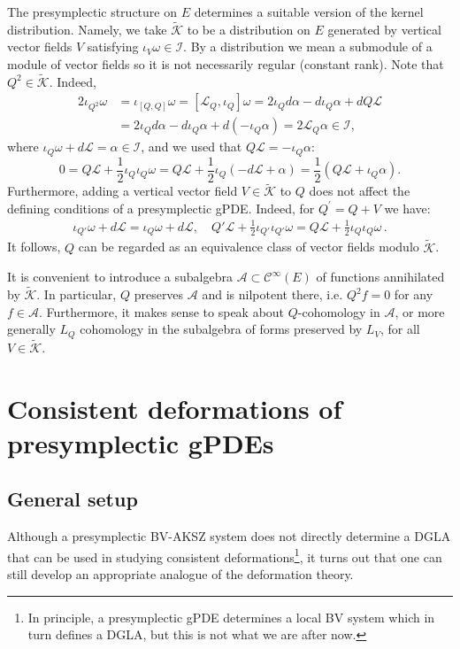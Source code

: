 \documentclass[a4paper,12pt]{article}
\numberwithin{equation}{section} %
\newcommand{\algA}{\mathcal{A}}
\newcommand{\cC}{\mathcal{C}}
\def\cI{\mathcal{I}}
\def\cK{\mathcal{K}}
\def\cL{\mathcal{L}}
\newcommand{\wker}{{\widetilde{\cK}}}
\newcommand{\h}{\cL}
\begin{document}
The presymplectic structure on $E$ determines a suitable version of the kernel distribution. Namely, we take $\wker$ to be a distribution on $E$ generated by vertical vector fields $V$ satisfying $\iota_V\omega \in \cI$. By a distribution we mean a submodule of a module of vector fields so it is not necessarily regular (constant rank). Note that $Q^2 \in \wker$. Indeed, 
\begin{align}
	2\iota_{Q^2}\omega &= \iota_{[Q,Q]}\omega = [\mathcal{L}_Q,\iota_Q]\omega = 2\iota_Qd \alpha - d \iota_Q\alpha + dQ\h \\
	&= 2\iota_Qd \alpha - d \iota_Q\alpha + d(-\iota_Q\alpha) = 2\mathcal{L}_Q\alpha \in \mathcal{I},
\end{align}
where $ \iota_Q\omega + d\h = \alpha \in \mathcal{I} $, and we used that $ Q\h = -\iota_Q\alpha $:
\begin{equation}
	0 = Q\h + \frac{1}{2}\iota_Q\iota_Q\omega = Q\h + \frac{1}{2}\iota_Q(-d\h + \alpha)  = \frac{1}{2}(Q\h + \iota_Q\alpha).
\end{equation}
Furthermore, adding a vertical vector field $V\in \wker$ to $Q$ does not affect the defining conditions of a presymplectic gPDE. Indeed, for $Q^\prime=Q+V$ we have:
\begin{align}
	\iota_{Q'}\omega + d\h = \iota_{Q}\omega + d\h, \quad Q'\h + \frac{1}{2}\iota_{Q'}\iota_{Q'}\omega = Q\h + \frac{1}{2}\iota_Q\iota_Q\omega\,.
\end{align}
It follows, $Q$ can be regarded as an equivalence class of vector fields modulo $\wker$.


It is convenient to introduce a subalgebra $\algA\subset \cC^\infty(E)$ of functions annihilated by $\wker$. In particular, $Q$ preserves $\algA$ and is nilpotent there, i.e. $Q^2f=0$ for any $f \in \algA$. Furthermore, it makes sense to speak about $Q$-cohomology in $\algA$, or more generally $L_Q$ cohomology in the subalgebra of forms preserved by $L_V$, for all $V \in \wker$.



\section{Consistent deformations of presymplectic gPDEs}
\label{sect:main}


\subsection{General setup}
Although a presymplectic BV-AKSZ system does not directly determine a DGLA that can be used in studying consistent deformations\footnote{In principle, a presymplectic gPDE  determines \cite{Grigoriev:2022zlq,Dneprov:2024cvt} a local BV system which in turn defines a DGLA, but this is not what we are after now.}, it turns out that one can still develop an appropriate  analogue of the deformation theory.
\end{document}
